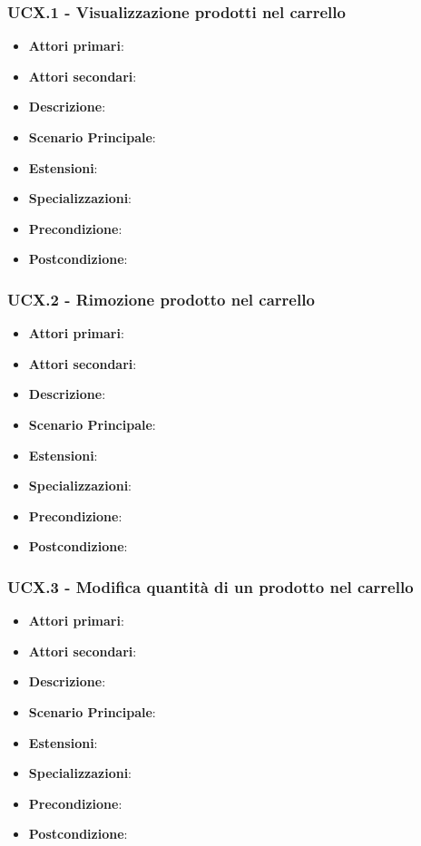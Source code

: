\subsubsection{UCX.1 - Visualizzazione prodotti nel carrello}
\begin{itemize}
\item \textbf{Attori primari}:
\item \textbf{Attori secondari}:
\item \textbf{Descrizione}:
\item \textbf{Scenario Principale}:
\item \textbf{Estensioni}:
\item \textbf{Specializzazioni}:
\item \textbf{Precondizione}:
\item \textbf{Postcondizione}:
\end{itemize}

\subsubsection{UCX.2 - Rimozione prodotto nel carrello}
\begin{itemize}
\item \textbf{Attori primari}:
\item \textbf{Attori secondari}:
\item \textbf{Descrizione}:
\item \textbf{Scenario Principale}:
\item \textbf{Estensioni}:
\item \textbf{Specializzazioni}:
\item \textbf{Precondizione}:
\item \textbf{Postcondizione}:
\end{itemize}

\subsubsection{UCX.3 - Modifica quantità di un prodotto nel carrello}
\begin{itemize}
\item \textbf{Attori primari}:
\item \textbf{Attori secondari}:
\item \textbf{Descrizione}:
\item \textbf{Scenario Principale}:
\item \textbf{Estensioni}:
\item \textbf{Specializzazioni}:
\item \textbf{Precondizione}:
\item \textbf{Postcondizione}:
\end{itemize}

